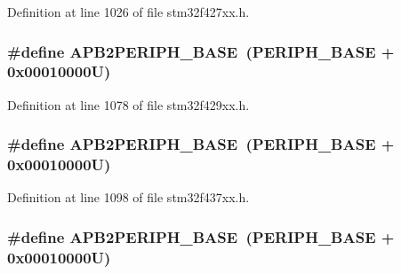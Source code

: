 Definition at line 1026 of file stm32f427xx.\+h.

\subsubsection[{\texorpdfstring{A\+P\+B2\+P\+E\+R\+I\+P\+H\+\_\+\+B\+A\+SE}{APB2PERIPH_BASE}}]{\setlength{\rightskip}{0pt plus 5cm}\#define A\+P\+B2\+P\+E\+R\+I\+P\+H\+\_\+\+B\+A\+SE~({\bf P\+E\+R\+I\+P\+H\+\_\+\+B\+A\+SE} + 0x00010000\+U)}\hypertarget{group___peripheral__memory__map_ga25b99d6065f1c8f751e78f43ade652cb}{}\label{group___peripheral__memory__map_ga25b99d6065f1c8f751e78f43ade652cb}


Definition at line 1078 of file stm32f429xx.\+h.

\subsubsection[{\texorpdfstring{A\+P\+B2\+P\+E\+R\+I\+P\+H\+\_\+\+B\+A\+SE}{APB2PERIPH_BASE}}]{\setlength{\rightskip}{0pt plus 5cm}\#define A\+P\+B2\+P\+E\+R\+I\+P\+H\+\_\+\+B\+A\+SE~({\bf P\+E\+R\+I\+P\+H\+\_\+\+B\+A\+SE} + 0x00010000\+U)}\hypertarget{group___peripheral__memory__map_ga25b99d6065f1c8f751e78f43ade652cb}{}\label{group___peripheral__memory__map_ga25b99d6065f1c8f751e78f43ade652cb}


Definition at line 1098 of file stm32f437xx.\+h.

\subsubsection[{\texorpdfstring{A\+P\+B2\+P\+E\+R\+I\+P\+H\+\_\+\+B\+A\+SE}{APB2PERIPH_BASE}}]{\setlength{\rightskip}{0pt plus 5cm}\#define A\+P\+B2\+P\+E\+R\+I\+P\+H\+\_\+\+B\+A\+SE~({\bf P\+E\+R\+I\+P\+H\+\_\+\+B\+A\+SE} + 0x00010000\+U)}\hypertarget{group___peripheral__memory__map_ga25b99d6065f1c8f751e78f43ade652cb}{}\label{group___peripheral__memory__map_ga25b99d6065f1c8f751e78f43ade652cb}


